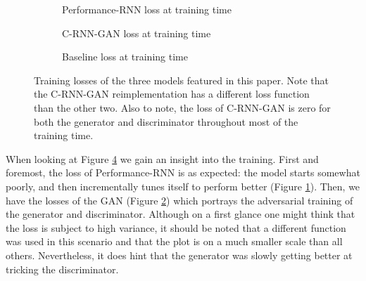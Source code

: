 \documentclass[a4paper]{book}
\begin{document}
\begin{figure}[ht]
    \newlength\figureheight
    \newlength\figurewidth
    \setlength\figureheight{6cm}
    \setlength\figurewidth{6cm}

    \begin{subfigure}{0.5\linewidth}
        \centering
        
        \caption{Performance-RNN loss at training time}
        \label{fig:loss_performancernn}
    \end{subfigure}
    \begin{subfigure}{0.5\linewidth}
        \centering
        
        \caption{C-RNN-GAN loss at training time}
        \label{fig:loss_crnngan}
    \end{subfigure}

    \setlength\figureheight{10cm}
    \setlength\figurewidth{10cm}

    \begin{subfigure}{\linewidth}
        \centering
        
        \caption{Baseline loss at training time}
        \label{fig:loss_baseline}
    \end{subfigure}
    \caption{Training losses of the three models featured in this paper. Note that the C-RNN-GAN reimplementation has a different loss function than the other two. Also to note, the loss of C-RNN-GAN is zero for both the generator and discriminator throughout most of the training time.}
    \label{fig:loss}
\end{figure}

When looking at Figure \ref{fig:loss} we gain an insight into the training. First and foremost, the loss of Performance-RNN is as expected: the model starts somewhat poorly, and then incrementally tunes itself to perform better (Figure \ref{fig:loss_performancernn}). Then, we have the losses of the GAN (Figure \ref{fig:loss_crnngan}) which portrays the adversarial training of the generator and discriminator. Although on a first glance one might think that the loss is subject to high variance, it should be noted that a different function was used in this scenario and that the plot is on a much smaller scale than all others. Nevertheless, it does hint that the generator was slowly getting better at tricking the discriminator.
\end{document}
